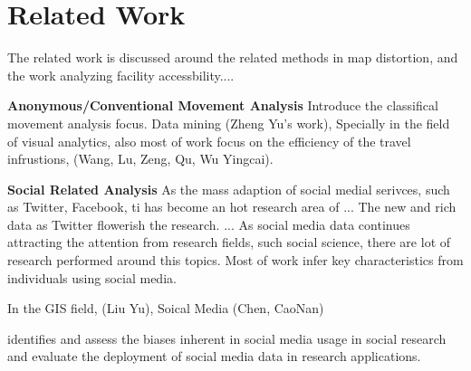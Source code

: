 \section{Related Work}

The related work is discussed around the related methods in map distortion, and the work analyzing facility accessbility....

\textbf{Anonymous/Conventional Movement Analysis} Introduce the classifical movement analysis focus. Data mining (Zheng Yu's work), Specially in the field of visual analytics, also most of work focus on the efficiency of the travel infrustions, (Wang, Lu, Zeng, Qu, Wu Yingcai). 

\textbf{Social Related Analysis} As the mass adaption of social medial serivces, such as Twitter, Facebook, ti has become an hot research area of ... The new and rich data as Twitter flowerish the research. ... As social media data continues attracting the attention from research fields, such social science, there are lot of research performed around this topics. Most of work infer key characteristics from individuals using social media. 

In the GIS field, (Liu Yu), Soical Media (Chen, CaoNan)

\cite{Longley2015}\cite{Paul2016_twitter} identifies and assess the biases inherent in social media usage in social research and evaluate the deployment of social media data in research applications.  






